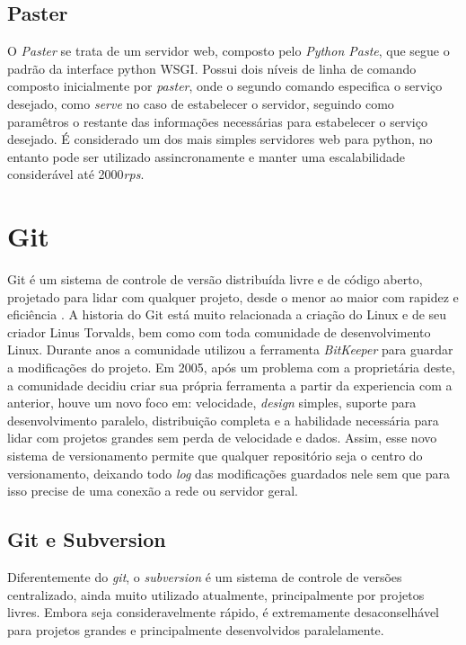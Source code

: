 \subsection{Paster}
O \textit{Paster} se trata de um servidor web, composto pelo \textit{Python Paste}, que segue o padrão da interface python WSGI. Possui  dois níveis de linha de comando composto inicialmente por \textit{paster}, onde o segundo comando especifica o serviço desejado, como \textit{serve} no caso de estabelecer o servidor, seguindo como paramêtros o restante das informações necessárias para estabelecer o serviço desejado. É considerado um dos mais simples servidores web para python, no entanto pode ser utilizado assincronamente e manter uma escalabilidade considerável até 2000\textit{rps}.

\section{Git}
Git é um sistema de controle de versão distribuída livre e de código aberto, projetado para lidar com qualquer projeto, desde o menor ao maior com rapidez e eficiência \cite{Software Freedom Conservancy 2012}.
A historia do Git está muito relacionada a criação do Linux  e de seu criador Linus Torvalds, bem como com toda comunidade de desenvolvimento Linux. Durante anos a comunidade utilizou a ferramenta \textit{BitKeeper} para guardar a modificações do projeto. Em 2005, após um problema com a proprietária deste, a comunidade decidiu criar sua própria ferramenta a partir da experiencia com a anterior, houve um novo foco em: velocidade, \textit{design} simples, suporte para desenvolvimento paralelo, distribuição completa e a habilidade necessária para lidar com projetos grandes sem perda de velocidade e dados.
Assim, esse novo sistema de versionamento permite que qualquer repositório seja o centro do versionamento, deixando todo \textit{log} das modificações guardados nele sem que para isso precise de uma conexão a rede ou servidor geral.

\subsection{Git e Subversion}
Diferentemente do \textit{git}, o \textit{subversion} é um sistema de controle de versões centralizado, ainda muito utilizado atualmente, principalmente por projetos livres. Embora seja consideravelmente rápido, é extremamente desaconselhável para projetos grandes e principalmente desenvolvidos paralelamente.

